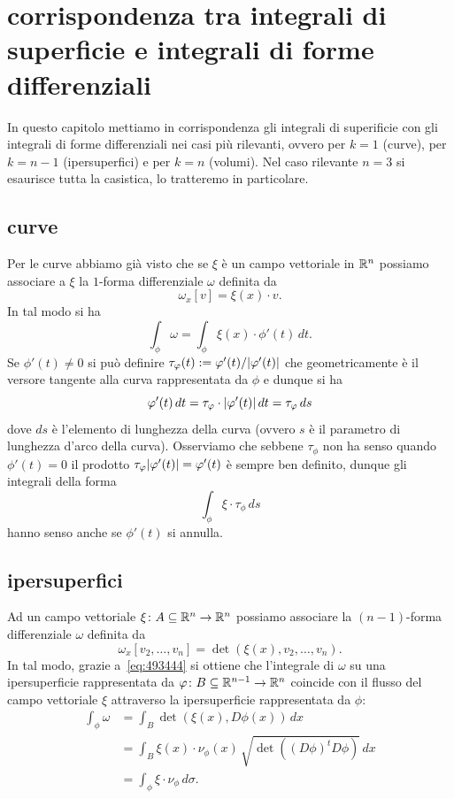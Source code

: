 \section{corrispondenza tra integrali di superficie e integrali di forme differenziali}

In questo capitolo mettiamo in corrispondenza gli integrali di superificie con gli integrali 
di forme differenziali nei casi più rilevanti, ovvero per $k=1$ (curve), per $k=n-1$ (ipersuperfici) 
e per $k=n$ (volumi). 
Nel caso rilevante $n=3$ si esaurisce tutta la casistica, lo tratteremo in particolare.

\subsection{curve}
Per le curve abbiamo già visto che se $\xi$ è un campo vettoriale in ${\mathbb R}^n$ 
possiamo associare a $\xi$ la $1$-forma differenziale $\omega$ definita da
\[
  \omega_x[v] = \xi(x) \cdot v.
\]
In tal modo si ha
\[
   \int_\phi \omega = \int_\phi \xi(x)\cdot \phi'(t)\, dt.
\]
Se $\phi'(t) \neq 0$ si può definire $\tau_\varphi(t) := \varphi'(t)/{\left|\varphi'(t)\right|}$ 
che geometricamente è il versore tangente alla curva rappresentata da $\phi$ e dunque
si ha 
\[
  \varphi'(t)\, dt = \tau_\varphi \cdot {\left|\varphi'(t)\right|}\, dt = \tau_\varphi\, ds
\]
dove $ds$ è l'elemento di lunghezza della curva (ovvero $s$ è il parametro di lunghezza d'arco della curva).
Osserviamo che sebbene $\tau_\phi$ non ha senso quando $\phi'(t) = 0$ il prodotto
$\tau_\varphi {\left|\varphi'(t)\right|} = \varphi'(t)$ è sempre ben definito, dunque gli integrali 
della forma 
\[
  \int_\phi \xi \cdot \tau_\phi\, ds
\] 
hanno senso anche se $\phi'(t)$ si annulla.

\subsection{ipersuperfici}

Ad un campo vettoriale $\xi\colon A\subseteq {\mathbb R}^n\to {\mathbb R}^n$ possiamo associare la 
$(n-1)$-forma differenziale $\omega$ definita da
\[
  \omega_x[v_2,\dots,v_n] = \det(\xi(x), v_2,\dots,v_n).
\]
In tal modo, grazie a~\eqref{eq:493444} si ottiene che 
l'integrale di $\omega$ su una ipersuperficie rappresentata da $\varphi\colon B\subseteq {\mathbb R}^{n-1} \to {\mathbb R}^n$
coincide con il flusso del campo vettoriale $\xi$ attraverso la ipersuperficie rappresentata da $\phi$: 
\begin{align*}
  \int_\phi \omega
  &= \int_B \det (\xi(x), D\phi(x))\, dx \\
  &= \int_B \xi(x) \cdot \nu_\phi(x) \, \sqrt{\det((D\phi)^t D\phi)}\, dx \\
  &= \int_\phi \xi \cdot \nu_\phi\, d\sigma.
\end{align*}


